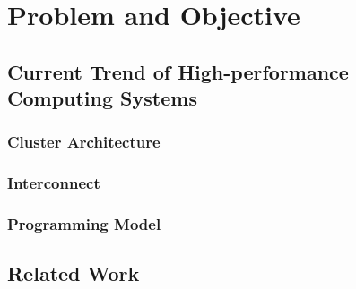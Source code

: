 \chapter{Problem and Objective}

\section{Current Trend of High-performance Computing Systems}

\subsection{Cluster Architecture}

\subsection{Interconnect}

\subsection{Programming Model}

\section{Related Work}

